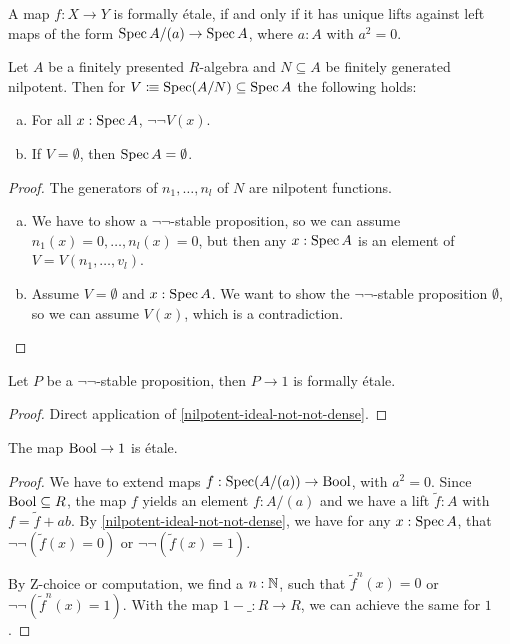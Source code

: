 \begin{lemma}%
  A map $f:X\to Y$ is formally étale,
  if and only if it has unique lifts against left maps of the form $\operatorname{Spec} A/(a)\to \operatorname{Spec} A$,
  where $a:A$ with $a^2=0$.
\end{lemma}

\begin{lemma}%
  \label{nilpotent-ideal-not-not-dense}
  Let $A$ be a finitely presented $R$-algebra and $N\subseteq A$ be finitely generated nilpotent.
  Then for $V\vcentcolon\mspace{-1.2mu}\equiv \operatorname{Spec} (A/N)\subseteq \operatorname{Spec} A$ the following holds:
  \begin{enumerate}[(a)]
  \item For all $x:\operatorname{Spec} A$, $\neg\neg V(x)$.
  \item If $V=\emptyset$, then $\operatorname{Spec} A=\emptyset$.
  \end{enumerate}
\end{lemma}

\begin{proof}
  The generators of $n_1,\dots,n_l$ of $N$ are nilpotent functions.
  \begin{enumerate}[(a)]
  \item We have to show a $\neg\neg$-stable proposition,
    so we can assume $n_1(x)=0,\dots,n_l(x)=0$, but then any $x:\operatorname{Spec} A$ is an element of $V=V(n_1,\dots,v_l)$.
  \item Assume $V=\emptyset$ and $x:\operatorname{Spec} A$.
        We want to show the $\neg\neg$-stable proposition $\emptyset$,
        so we can assume $V(x)$, which is a contradiction.
  \end{enumerate}
\end{proof}

\begin{proposition}%
  Let $P$ be a $\neg\neg$-stable proposition,
  then $P\to 1$ is formally étale.
\end{proposition}

\begin{proof}
  Direct application of \cref{nilpotent-ideal-not-not-dense}.
\end{proof}

\begin{proposition}%
  The map $\mathrm{Bool}\to 1$ is étale.
\end{proposition}

\begin{proof}
  We have to extend maps $f:\operatorname{Spec} (A/(a))\to \mathrm{Bool}$, with $a^2=0$.
  Since $\mathrm{Bool}\subseteq R$, the map $f$ yields an element $f:A/(a)$
  and we have a lift $\tilde{f}:A$ with $f=\tilde{f}+ab$.
  By \cref{nilpotent-ideal-not-not-dense},
  we have for any $x:\operatorname{Spec} A$, that $\neg\neg(\tilde{f}(x)=0)$ or $\neg\neg(\tilde{f}(x)=1)$.

  By Z-choice or computation, we find a $n:\mathbb{N}$,
  such that $\tilde{f}^n(x)=0$ or $\neg\neg(\tilde{f}^n(x)=1)$.
  With the map $1-\_:R\to R$, we can achieve the same for $1$.
\end{proof}